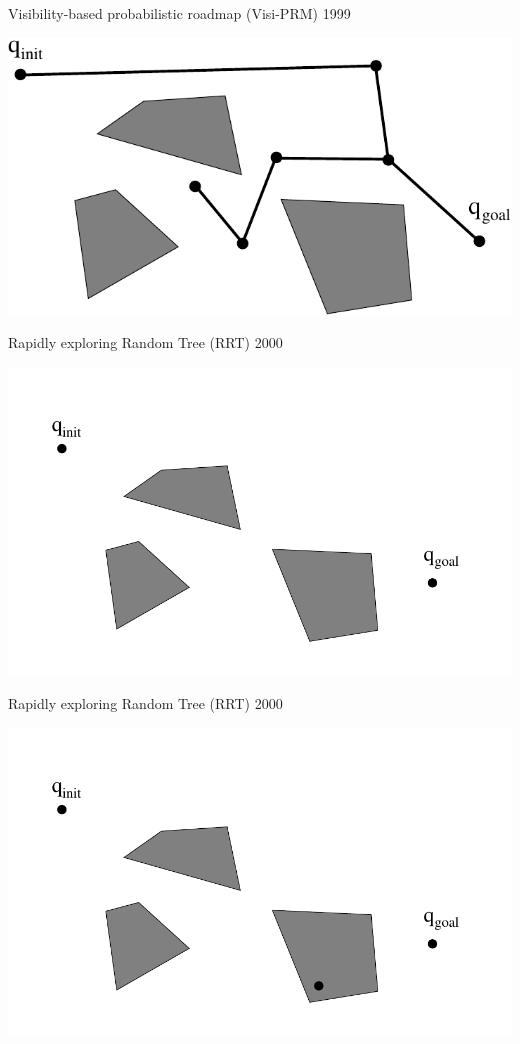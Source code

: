 \begin{frame} {Visibility-based probabilistic roadmap (Visi-PRM) 1999}
\centerline {
  \includegraphics[width=.8\linewidth]{figures/VPRM15.pdf}
}
\end{frame}

%
%

\begin{frame} {Rapidly exploring Random Tree (RRT) 2000}
\centerline {
  \includegraphics[width=.8\linewidth]{figures/RRT1.pdf}
}
\end{frame}

\begin{frame} {Rapidly exploring Random Tree (RRT) 2000}
\centerline {
  \includegraphics[width=.8\linewidth]{figures/RRT2.pdf}
}
\end{frame}

